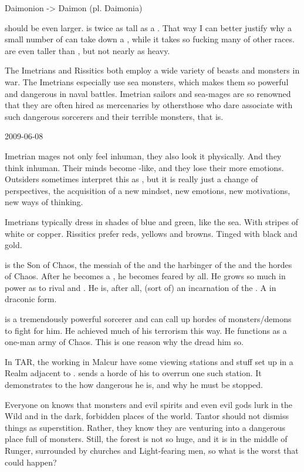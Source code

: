 Daimonion -> Daimon (pl. Daimonia)

\Resphain should be even larger. 
\Teshrial is twice as tall as a \human.
That way I can better justify why a small number of \resphain can take down a \dragon, while it takes so fucking many of other races.
\Resphain are even taller than \aryothim, but not nearly as heavy.

The Imetrians and Rissitics both employ a wide variety of beasts and monsters in war.
The Imetrians especially use sea monsters, which makes them so powerful and dangerous in naval battles. 
Imetrian sailors and sea-mages are so renowned that they are often hired as mercenaries by others\dash{}those who dare associate with such dangerous sorcerers and their terrible monsters, that is.



2009-06-08

Imetrian mages not only feel inhuman, they also look it physically.
And they think inhuman. 
Their minds become \naga-like, and they lose their more \scathaese emotions.
Outsiders sometimes interpret this as , but it is really just a change of perspectives, the acquisition of a new mindset, new emotions, new motivations, new ways of thinking.

Imetrians typically dress in shades of blue and green, like the sea. With stripes of white or copper.
Rissitics prefer reds, yellows and browns. Tinged with black and gold.

\Vizsherioch is the Son of Chaos, the messiah of the \dragons and the harbinger of the \xs and the hordes of Chaos. 
After he becomes a \shaeeroth, he becomes feared by all.
He grows so much in power as to rival \Secherdamon and \Ishnaruchaefir. 
He is, after all, (sort of) an incarnation of the \xs. A \xs in draconic form.

\Ishnaruchaefir is a tremendously powerful sorcerer and can call up hordes of monsters/demons to fight for him. 
He achieved much of his terrorism this way.
He functions as a one-man army of Chaos. 
This is one reason why the \resphain dread him so. 

In TAR, the \resphain working in Malcur have some viewing stations and stuff set up in a Realm adjacent to \Azmith. 
\Ishnaruchaefir sends a horde of his \daemons to overrun one such station. 
It demonstrates to the \resphain how dangerous he is, and why he must be stopped.

Everyone on \Azmith knows that monsters and evil spirits and even evil gods lurk in the Wild and in the dark, forbidden places of the world.
\Jirad Tantor should not dismiss things as superstition.
Rather, they know they are venturing into a dangerous place full of monsters.
Still, the forest is not so huge, and it is in the middle of Runger, surrounded by churches and Light-fearing men, so what is the worst that could happen?

